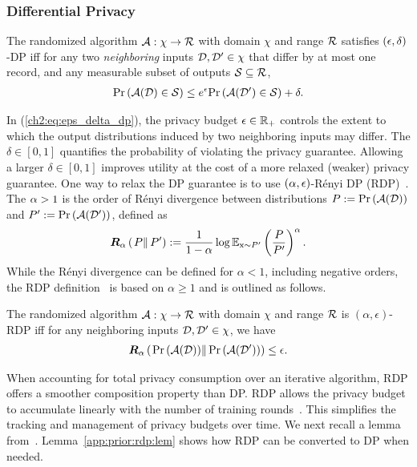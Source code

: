\subsubsection{Differential Privacy}\label{app:prior:rdp}


{
\begin{definition}\label{app:epsdeltaDP}
The randomized algorithm ${\mathcal{A}}:\chi\rightarrow {{\mathcal{R}}}$ with domain $\chi$ and range ${{\mathcal{R}}}$ satisfies $({\epsilon}, \delta)$-DP iff for any two {\em neighboring} inputs $\mathcal{D},\mathcal{D}'\in \chi$ that differ by at most one record, and any measurable subset of outputs ${\mathcal{S}} \subseteq {{\mathcal{R}}}$,
\begin{align}\label{ch2:eq:eps_delta_dp}
\text{Pr}\left({\mathcal{A}}(\mathcal{D})\in {\mathcal{S}}\right) \leq e^{{\epsilon}}\text{Pr}\left({\mathcal{A}}(\mathcal{D}')\in {\mathcal{S}}\right) + \delta.
\end{align} 
\end{definition}
}

{In (\ref{ch2:eq:eps_delta_dp}), the privacy budget ${\epsilon} \in {\mathbb{R}}_{+}$ controls the extent to which the output distributions induced by two neighboring inputs may differ. The $\delta\in [0,1]$ quantifies the probability of violating the privacy guarantee. Allowing a larger $\delta\in [0,1]$  improves utility at the cost of a more relaxed (weaker) privacy guarantee. One way to relax the DP guarantee is to use $({\alpha},{\epsilon})$-Rényi DP (RDP)~\citep{mironov2017renyi}. The ${\alpha}>1$ is the order of R\'{e}nyi divergence between distributions $P:=\text{Pr}\left({\mathcal{A}}(\mathcal{D})\right)$ and $P':=\text{Pr}\left({\mathcal{A}}(\mathcal{D}')\right)$, defined as 
\begin{align}
{\bm{R}}_{{\alpha}}\left(\left. P\right\| P'\right):=\frac{1}{1-{\alpha}}\log \mathbb{E}_{{\textnormal{x}}\sim P'}\left(\frac{P}{P'}\right)^{{\alpha}}.
\end{align}
}
{
While the R\'{e}nyi divergence can be defined for $\alpha < 1$, including negative orders, the RDP definition~\cite{mironov2017renyi} is based on $\alpha \geq 1$ and is outlined as follows.
}
{
\begin{definition}\label{def:RDP}
The randomized algorithm ${\mathcal{A}}:\chi\rightarrow {{\mathcal{R}}}$ with domain $\chi$ and range ${{\mathcal{R}}}$ is $(\alpha,\epsilon)$-RDP iff for any neighboring inputs ${{{\mathcal{D}}}} , {{{\mathcal{D}}}'}\in \chi$,  we have
\begin{align}
 {\bm{R}}_{{\alpha}}\left(\left. \text{Pr}\left({\mathcal{A}}(\mathcal{D})\right)\right\| \text{Pr}\left({\mathcal{A}}(\mathcal{D}')\right)\right)\leq {\epsilon}.
\end{align}
\end{definition}
}

When accounting for total privacy consumption over an iterative algorithm, RDP offers a smoother composition property than DP. RDP allows the privacy budget to accumulate linearly with the number of training rounds~\citep{mironov2017renyi}. This simplifies the tracking and management of privacy budgets over time. We next recall a lemma from~\citep{mironov2017renyi}. Lemma~\ref{app:prior:rdp:lem} shows how RDP can be converted to DP when needed.  


